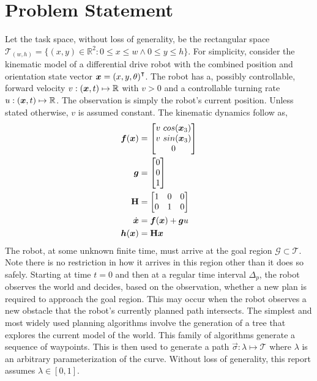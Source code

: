 \documentclass[oneside, 11pt]{book}
\begin{document}
\section{Problem Statement}
Let the task space, without loss of generality, be the rectangular space  $\mathcal{T}_{(w,h)} = \{(x,y)\in\mathbb{R}^2 : 0 \leq x \leq w \wedge 0 \leq y \leq h\}$. For simplicity, consider the kinematic model of a differential drive robot with the combined position and orientation state vector $\bm{x}={(x,y,\theta)}^{\intercal}$. The robot has a, possibly controllable, forward velocity $v:(\bm{x}, t)\mapsto\mathbb{R}$ with $v>0$ and a controllable turning rate $u:(\bm{x}, t)\mapsto\mathbb{R}$. The observation is simply the robot's current position. Unless stated otherwise, $v$ is assumed constant. The kinematic dynamics follow as,
\begin{align}
    \bm{f}(\bm{x}) &=
        \begin{bmatrix}
            v~cos(\bm{x}_3)\\
            v~sin(\bm{x}_3)\\
            0
        \end{bmatrix} \nonumber \\
    \bm{g} &= \begin{bmatrix} 0 \\ 0 \\ 1 \end{bmatrix} \nonumber \\
    \mathbf{H} &=
        \begin{bmatrix}
            1 & 0 & 0\\
            0 & 1 & 0
        \end{bmatrix} \nonumber \\
    \dot{\bm{x}} &=
        \bm{f}(\bm{x})
        +
        \bm{g} u \nonumber \\
    \bm{h}(\bm{x}) &= \mathbf{H}\bm{x}
    \label{eqn:basic_kinematic_model}
\end{align}
The robot, at some unknown finite time, must arrive at the goal region $\mathcal{G}\subset\mathcal{T}$. Note there is no restriction in how it arrives in this region other than it does so safely. Starting at time $t=0$ and then at a regular time interval $\Delta_p$, the robot observes the world and decides, based on the observation, whether a new plan is required to approach the goal region. This may occur when the robot observes a new obstacle that the robot's currently planned path intersects. The simplest and most widely used planning algorithms involve the generation of a tree that explores the current model of the world. This family of algorithms generate a sequence of waypoints. This is then used to generate a path $\vec{\sigma}: \lambda \mapsto \mathcal{T}$ where $\lambda$ is an arbitrary parameterization of the curve. Without loss of generality, this report assumes $\lambda\in[0,1]$.
\end{document}
